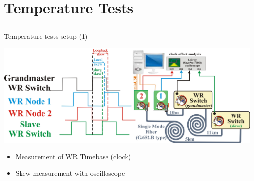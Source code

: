\documentclass[compress,red]{beamer}
\begin{document}
\section{Temperature Tests}
\subsection{}
\begin{frame}{Temperature tests setup (1)}

	\begin{center}
	\includegraphics[width=1.0\textwidth]{measurements/tempTests-setup.pdf}

	\begin{itemize}
		\item Measurement of WR Timebase (clock)
		\item Skew measurement with oscilloscope
	\end{itemize}	

	\end{center}


\end{frame}
\end{document}
